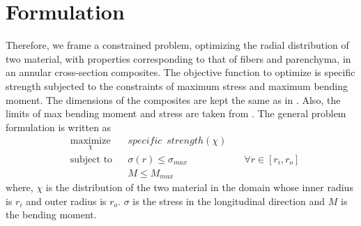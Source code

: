 \documentclass[openright,twoside]{iitkthesis}
\begin{document}
\section{Formulation}
Therefore, we frame a constrained problem, optimizing the radial distribution of two material, with properties corresponding to that of fibers and parenchyma, in an annular cross-section composites. The objective function to optimize is specific strength subjected to the constraints of maximum stress and maximum bending moment. The dimensions of the composites are kept the same as in \cite{mannan2018stiffness}. Also, the limits of max bending moment and stress are taken from \cite{mannan2018stiffness}. The general problem formulation is written as
\begin{equation*}
\begin{aligned}
& \underset{\chi}{\text{maximize}}
& & specific\,\,\,strength(\chi) \\
& \text{subject to}
& & \sigma(r) \leq \sigma_{max} &\quad \forall r \in [r_i, r_o]\\
& & & M \leq M_{max}
\end{aligned}
\end{equation*}
where, $\chi$ is the distribution of the two material in the domain whose inner radius is $r_i$ and outer radius is $r_o$.  $\sigma$ is the stress in the longitudinal direction and $M$ is the bending moment. \\
\end{document}
